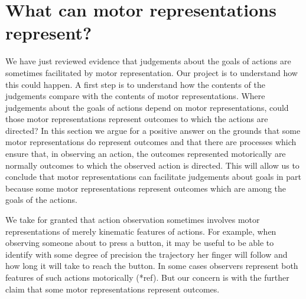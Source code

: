 \documentclass[12pt,\papersize]{extarticle}
\begin{document}
\section{What can motor representations represent?}
\label{sec:content}

We have just reviewed evidence that judgements about the goals of actions  are sometimes facilitated by motor representation. Our project is to understand how this could happen.  A first step is to understand how the contents of the judgements compare with the contents of motor representations. Where judgements about the goals of actions depend on motor representations, could those motor representations represent outcomes to which the actions are directed?  In this section we argue for a positive answer on the grounds that some motor representations do represent outcomes and that there are processes which ensure that, in observing an action, the outcomes represented motorically are normally outcomes to which the observed action is directed. This will allow us to conclude that motor representations can facilitate judgements about goals in part because some motor representations represent outcomes which are among the goals of the actions.  

We take for granted that action observation sometimes involves motor representations of merely kinematic features of actions.  For example, when observing someone about to press a button, it may be useful to be able to identify with some degree of precision the trajectory her finger will follow and how long it will take to reach the button. In some cases observers represent both features of such actions motorically (*ref). But our concern is with the further claim that some motor representations represent outcomes. 
\end{document}
